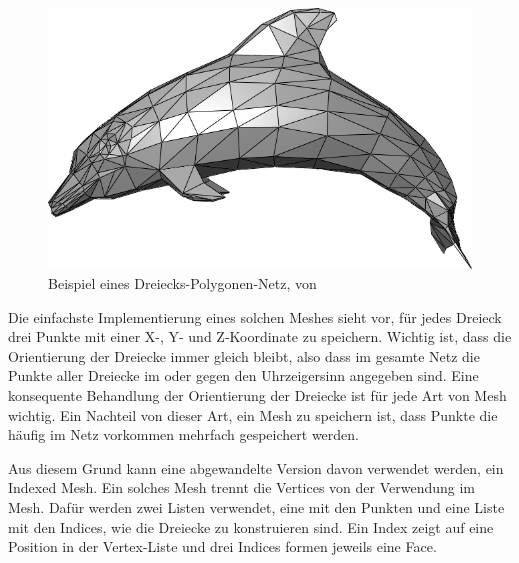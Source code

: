 \begin{figure}[h]
	\centering
	\includegraphics[width=0.7\linewidth]{Images/Dolphin_triangle_mesh}
	\caption[Beispiel eines Polygonen-Netzes]{Beispiel eines Dreiecks-Polygonen-Netz, von \cite{WikipediaDolphin1}}
	\label{fig:dolphintrianglemesh}
\end{figure}


Die einfachste Implementierung eines solchen Meshes sieht vor, f\"ur jedes Dreieck drei Punkte mit einer X-, Y- und Z-Koordinate zu speichern. Wichtig ist, dass die Orientierung der Dreiecke immer gleich bleibt, also dass im gesamte Netz die Punkte aller Dreiecke im oder gegen den Uhrzeigersinn angegeben sind. Eine konsequente Behandlung der Orientierung der Dreiecke ist f\"ur jede Art von Mesh wichtig. Ein Nachteil von dieser Art, ein Mesh zu speichern ist, dass Punkte die h\"aufig im Netz vorkommen mehrfach gespeichert werden. 

Aus diesem Grund kann eine abgewandelte Version davon verwendet werden, ein Indexed Mesh. Ein solches Mesh trennt die Vertices von der Verwendung im Mesh. Daf\"ur werden zwei Listen verwendet, eine mit den Punkten und eine Liste mit den Indices, wie die Dreiecke zu konstruieren sind. Ein Index zeigt auf eine Position in der Vertex-Liste und drei Indices formen jeweils eine Face.


